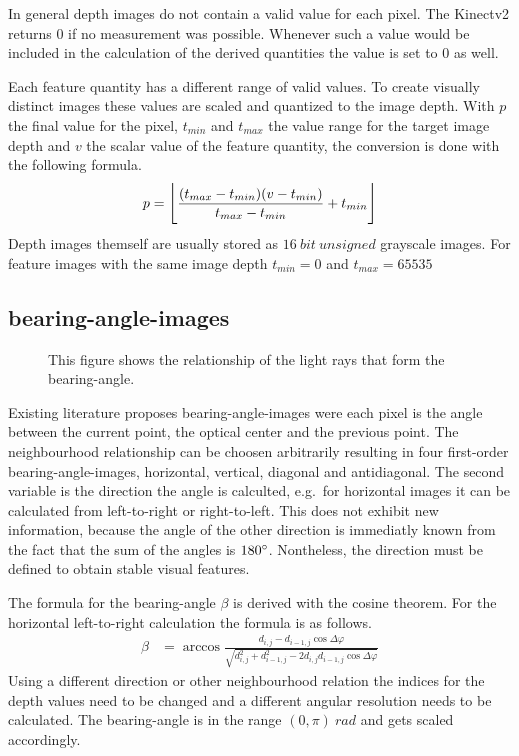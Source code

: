 \documentclass[doktyp=marbeit,fontsize=12pt,sprache=english,draft=true,hausschrift=true,fleqn]{TUBAFarbeiten}
\DeclarePairedDelimiter{\floor}{\lfloor}{\rfloor}
\begin{document}
In general depth images do not contain a valid value for each pixel.
The Kinectv2 returns $0$ if no measurement was possible.
Whenever such a value would be included in the calculation of the derived quantities the value is set to $0$ as well.

Each feature quantity has a different range of valid values.
To create visually distinct images these values are scaled and quantized to the image depth.
With $p$ the final value for the pixel, $t_{min}$ and $t_{max}$ the value range for the target image depth and $v$ the scalar value of the feature quantity, the conversion is done with the following formula.
\begin{align}
    p = \floor[\Bigg]{\frac{{(t_{max} - t_{min})} {(v - t_{min})}}{t_{max} - t_{min}} + t_{min}}
\end{align}
Depth images themself are usually stored as $16~bit~unsigned$ grayscale images.
For feature images with the same image depth $t_{min} = 0$ and $t_{max} = 65535$

\subsection{\Glspl{bearing-angle-image}}

\begin{figure}[H]
    \centering
    \caption[Schematic Representation of Bearing-Angles]{This figure shows the relationship of the light rays that form the \gls{bearing-angle}.}
\end{figure}

Existing literature\cite{Scaramuzza2007,Lin2017} proposes \Glspl{bearing-angle-image} were each pixel is the angle between the current point, the optical center and the previous point.
The neighbourhood relationship can be choosen arbitrarily resulting in four first-order \Glspl{bearing-angle-image}, horizontal, vertical, diagonal and antidiagonal.
The second variable is the direction the angle is calculted, e.g.~for horizontal images it can be calculated from left-to-right or right-to-left.
This does not exhibit new information, because the angle of the other direction is immediatly known from the fact that the sum of the angles is $180\degree$.
Nontheless, the direction must be defined to obtain stable visual features.

The formula for the \gls{bearing-angle} $\beta$ is derived with the cosine theorem.
For the horizontal left-to-right calculation the formula is as follows.
\begin{align}
    \beta&= \arccos%
            \frac{d_{i,j} - d_{i-1,j} \cos \Delta\varphi}%
                 {\sqrt{d_{i,j}^2 + d_{i-1,j}^2 - 2 d_{i,j} d_{i-1,j} \cos \Delta\varphi}}
\end{align}
Using a different direction or other neighbourhood relation the indices for the depth values need to be changed and a different angular resolution needs to be calculated.
The \Gls{bearing-angle} is in the range $(0, \pi)~rad$ and gets scaled accordingly.
\end{document}

